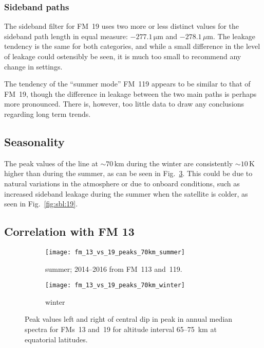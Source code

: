 \subsubsection{Sideband paths}
\label{FM19:sbpath}
The sideband filter for FM~19 uses two more or less distinct values for the
sideband path length in equal measure: $-277.1\,\mathrm{\mu m}$ and
$-278.1\,\mu\mathrm{m}$.  The leakage tendency is the same for both categories,
and while a small difference in the level of leakage could ostensibly be seen,
it is much too small to recommend any change in settings.

The tendency of the ``summer mode'' FM~119 appears to be similar to that of
FM~19, though the difference in leakage between the two main paths is perhaps
more pronounced.  There is, however, too little data to draw any conclusions
regarding long term trends.

\subsection{Seasonality}
\label{FM19:seasonality}
The peak values of the  line at $\sim70\,\mathrm{km}$ during the
winter are consistently $\sim10\,\mathrm{K}$ higher than during the summer, as
can be seen in Fig.~\ref{fig:peaks:13v19}.  This could be due to natural
variations in the atmosphere or due to onboard conditions, such as increased
sideband leakage during the summer when the satellite is colder, as seen in
Fig.~\ref{fig:sbl:19}.


\subsection{Correlation with FM 13}
\label{FM19:FM13:corr}

\begin{figure}[ht]
    \centering
    \begin{subfigure}[b]{0.9545\textwidth}
        \texttt{[image: fm\_13\_vs\_19\_peaks\_70km\_summer]}
        \caption{summer; 2014--2016 from FM~113 and~119.
            }\label{fig:peaks:13v19:summer}
    \end{subfigure}
    \begin{subfigure}[b]{0.9545\textwidth}
        \texttt{[image: fm\_13\_vs\_19\_peaks\_70km\_winter]}
        \caption{winter}\label{fig:peaks:13v19:winter}
    \end{subfigure}
    \caption{Peak values left and right of central dip in  peak in
        annual median spectra for FMs~13 and~19 for altitude interval
        65--75~km at equatorial latitudes.
    }\label{fig:peaks:13v19}
\end{figure}

